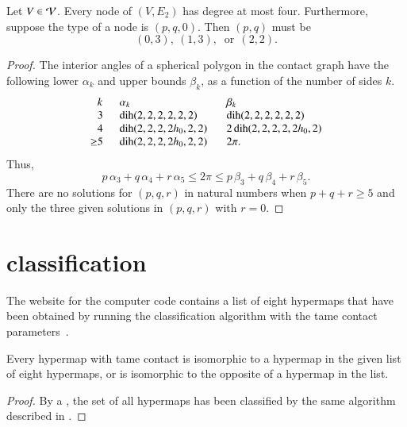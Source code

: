 \documentclass{llncs}
\def\op#1{{\hbox{#1}}}
\begin{document}
\begin{lemma}\label{lemma:no-5} 
  Let $V\in {\mathcal V}$.  Every node of $(V,E_{2})$ has degree at most
  four.  Furthermore, suppose the type of a node is $(p,q,0)$.  Then
  $(p,q)$ must be
\[
(0,3),~(1,3),~\text{ or}~~(2,2).
\]
\end{lemma}

\begin{proof} The interior angles of a spherical polygon in the
  contact graph have the following lower $\alpha_k$ and upper bounds
  $\beta_k$, as a function of the number of sides $k$.
\begin{equation}
\begin{array}{lllll}
  \phantom{\ge}k~~&\alpha_k & \beta_k\\
  \phantom{\ge}3~~&\op{dih}(2,2,2,2,2,2)  &\op{dih}(2,2,2,2,2,2)\\
  \phantom{\ge}4~~&\op{dih}(2,2,2,2h_0,2,2) &2\,\op{dih}(2,2,2,2,2h_0,2)\\
  {\ge}5~~& \op{dih}(2,2,2,2h_0,2,2) ~~~& 2\pi.
\end{array}
\end{equation}
Thus,
\[
  p\,\alpha_3 + q\,\alpha_4 +r\, \alpha_5 
\le 2\pi \le p\,\beta_3 + q\,\beta_4 + r \,\beta_5.
\]
There are no solutions for
$(p,q,r)$ in natural numbers when $p+q+r\ge 5$ and
 only the three given solutions in $(p,q,r)$ with $r=0$.
\end{proof}



\section{classification}

The website for the computer code  contains a list of eight hypermaps
that have been obtained by running the classification algorithm with
the tame contact parameters~\cite{website:FlyspeckProject}.

\begin{lemma}\cutrate{}
  \label{lemma:contact-classification} Every hypermap with tame
  contact is isomorphic to a hypermap in the given list of eight
  hypermaps, or is isomorphic to the opposite of a hypermap in the
  list.  %
\end{lemma}

\begin{proof}
  By a , %
 the set of all hypermaps has been classified by the same
  algorithm described in \cite{DSP}.
\end{proof}
\end{document}
